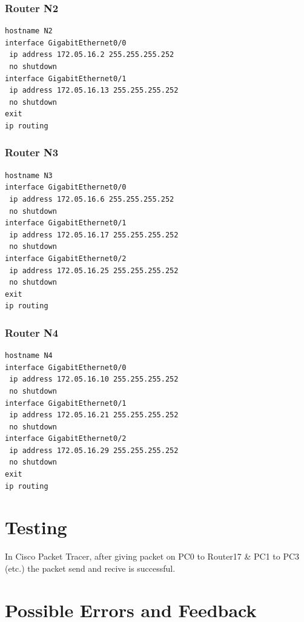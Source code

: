\documentclass[12pt]{report}
\begin{document}
\subsection{Router N2}
\begin{lstlisting}[basicstyle=\ttfamily\small, frame=single]
hostname N2
interface GigabitEthernet0/0
 ip address 172.05.16.2 255.255.255.252
 no shutdown
interface GigabitEthernet0/1
 ip address 172.05.16.13 255.255.255.252
 no shutdown
exit
ip routing
\end{lstlisting}

\subsection{Router N3}
\begin{lstlisting}[basicstyle=\ttfamily\small, frame=single]
hostname N3
interface GigabitEthernet0/0
 ip address 172.05.16.6 255.255.255.252
 no shutdown
interface GigabitEthernet0/1
 ip address 172.05.16.17 255.255.255.252
 no shutdown
interface GigabitEthernet0/2
 ip address 172.05.16.25 255.255.255.252
 no shutdown
exit
ip routing
\end{lstlisting}

\subsection{Router N4}
\begin{lstlisting}[basicstyle=\ttfamily\small, frame=single]
hostname N4
interface GigabitEthernet0/0
 ip address 172.05.16.10 255.255.255.252
 no shutdown
interface GigabitEthernet0/1
 ip address 172.05.16.21 255.255.255.252
 no shutdown
interface GigabitEthernet0/2
 ip address 172.05.16.29 255.255.255.252
 no shutdown
exit
ip routing
\end{lstlisting}
\newpage

\chapter{Testing}
In Cisco Packet Tracer, after giving packet on PC0 to Router17 \& PC1 to PC3 (etc.) the packet send and recive is successful. 

\chapter{Possible Errors and Feedback}
\end{document}
